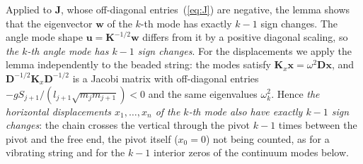 \documentclass[11pt]{article}
\newcommand{\K}{\mathbf{K}}
\newcommand{\D}{\mathbf{D}}
\newcommand{\J}{\mathbf{J}}
\begin{document}
Applied to $\J$, whose off-diagonal entries~(\ref{eq:J}) are negative, the lemma shows that the eigenvector $\mathbf{w}$ of the $k$-th mode has exactly $k-1$ sign changes. The angle mode shape $\mathbf{u}=\K^{-1/2}\mathbf{w}$ differs from it by a positive diagonal scaling, so \emph{the $k$-th angle mode has $k-1$ sign changes}. For the displacements we apply the lemma independently to the beaded string: the modes satisfy $\K_x\mathbf{x}=\omega^2\D\mathbf{x}$, and $\D^{-1/2}\K_x\D^{-1/2}$ is a Jacobi matrix with off-diagonal entries $-gS_{j+1}/(l_{j+1}\sqrt{m_jm_{j+1}})<0$ and the same eigenvalues $\omega_k^2$. Hence \emph{the horizontal displacements $x_1,\dots,x_n$ of the $k$-th mode also have exactly $k-1$ sign changes}: the chain crosses the vertical through the pivot $k-1$ times between the pivot and the free end, the pivot itself ($x_0=0$) not being counted, as for a vibrating string and for the $k-1$ interior zeros of the continuum modes below.
\end{document}

